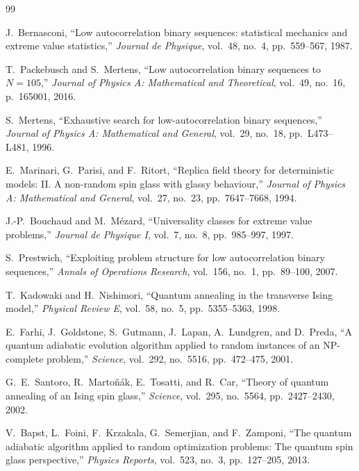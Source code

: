\begin{thebibliography}{99}

J.~Bernasconi,
``Low autocorrelation binary sequences: statistical mechanics and extreme value statistics,''
\emph{Journal de Physique}, vol.~48, no.~4, pp.~559--567, 1987.

T.~Packebusch and S.~Mertens,
``Low autocorrelation binary sequences to $N=105$,''
\emph{Journal of Physics A: Mathematical and Theoretical}, vol.~49, no.~16, p.~165001, 2016.

S.~Mertens,
``Exhaustive search for low-autocorrelation binary sequences,''
\emph{Journal of Physics A: Mathematical and General}, vol.~29, no.~18, pp.~L473--L481, 1996.

E.~Marinari, G.~Parisi, and F.~Ritort,
``Replica field theory for deterministic models: II. A non-random spin glass with glassy behaviour,''
\emph{Journal of Physics A: Mathematical and General}, vol.~27, no.~23, pp.~7647--7668, 1994.

J.-P.~Bouchaud and M.~M{\'e}zard,
``Universality classes for extreme value problems,''
\emph{Journal de Physique I}, vol.~7, no.~8, pp.~985--997, 1997.

S.~Prestwich,
``Exploiting problem structure for low autocorrelation binary sequences,''
\emph{Annals of Operations Research}, vol.~156, no.~1, pp.~89--100, 2007.

T.~Kadowaki and H.~Nishimori,
``Quantum annealing in the transverse Ising model,''
\emph{Physical Review E}, vol.~58, no.~5, pp.~5355--5363, 1998.

E.~Farhi, J.~Goldstone, S.~Gutmann, J.~Lapan, A.~Lundgren, and D.~Preda,
``A quantum adiabatic evolution algorithm applied to random instances of an NP-complete problem,''
\emph{Science}, vol.~292, no.~5516, pp.~472--475, 2001.

G.~E.~Santoro, R.~Marto{\v{n}}{\'a}k, E.~Tosatti, and R.~Car,
``Theory of quantum annealing of an Ising spin glass,''
\emph{Science}, vol.~295, no.~5564, pp.~2427--2430, 2002.

V.~Bapst, L.~Foini, F.~Krzakala, G.~Semerjian, and F.~Zamponi,
``The quantum adiabatic algorithm applied to random optimization problems: The quantum spin glass perspective,''
\emph{Physics Reports}, vol.~523, no.~3, pp.~127--205, 2013.


\end{thebibliography}
